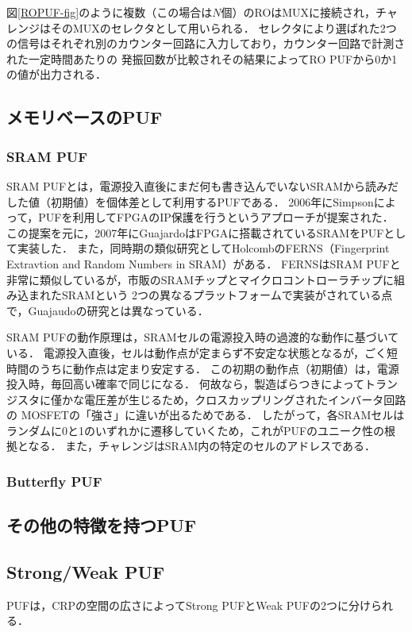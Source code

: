 \documentclass[technicalreport]{ieicej} %
\begin{document}
図\ref{ROPUF-fig}のように複数（この場合は$N$個）のROはMUXに接続され，チャレンジはそのMUXのセレクタとして用いられる．
セレクタにより選ばれた2つの信号はそれぞれ別のカウンター回路に入力しており，カウンター回路で計測された一定時間あたりの
発振回数が比較されその結果によってRO PUFから0か1の値が出力される．
\subsection{メモリベースのPUF}
\subsubsection{SRAM PUF}
\label{SRAM PUF}
SRAM PUFとは，電源投入直後にまだ何も書き込んでいないSRAMから読みだした値（初期値）を個体差として利用するPUFである\cite{sugatake}．
2006年にSimpsonによって，PUFを利用してFPGAのIP保護を行うというアプローチ\cite{simpson}が提案された．
この提案を元に，2007年にGuajardoはFPGAに搭載されているSRAMをPUFとして実装\cite{guajaudo}した．
また，同時期の類似研究としてHolcombのFERNS（Fingerprint Extravtion and Random Numbers in SRAM）\cite{holcomb}がある．
FERNSはSRAM PUFと非常に類似しているが，市販のSRAMチップとマイクロコントローラチップに組み込まれたSRAMという
2つの異なるプラットフォームで実装がされている点で，Guajaudoの研究とは異なっている\cite{maes1}．

SRAM PUFの動作原理は，SRAMセルの電源投入時の過渡的な動作に基づいている．
電源投入直後，セルは動作点が定まらず不安定な状態となるが，ごく短時間のうちに動作点は定まり安定する．
この初期の動作点（初期値）は，電源投入時，毎回高い確率で同じになる．
何故なら，製造ばらつきによってトランジスタに僅かな電圧差が生じるため，クロスカップリングされたインバータ回路の
MOSFETの「強さ」に違いが出るためである\cite{maes1}．
したがって，各SRAMセルはランダムに0と1のいずれかに遷移していくため，これがPUFのユニーク性の根拠となる．
また，チャレンジはSRAM内の特定のセルのアドレスである．
\subsubsection{Butterfly PUF}
\subsection{その他の特徴を持つPUF}

\subsection{Strong/Weak PUF}
PUFは，CRPの空間の広さによってStrong PUFとWeak PUFの2つに分けられる．
\end{document}
